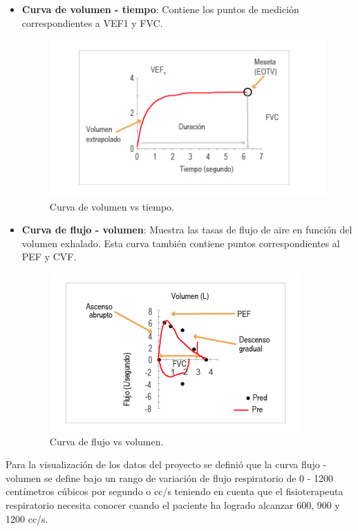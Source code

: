 \documentclass[12pt]{article}
\begin{document}
\begin{itemize}
    \item \textbf{Curva de volumen - tiempo}: Contiene los puntos de medición correspondientes a VEF1 y FVC.

        \begin{figure}[ht]
        \centering
        \includegraphics[scale=0.7]{imag/vvstiempo.png}
        \caption{Curva de volumen vs tiempo. }
        \label{4}
        \end{figure}
        \FloatBarrier

    
    \item \textbf{Curva de flujo - volumen}: Muestra las tasas de flujo de aire en función del volumen exhalado. Esta curva también contiene puntos correspondientes al PEF y CVF.
    
        \begin{figure}[ht]
        \centering
        \includegraphics[scale=0.7]{imag/flujovs.png}
        \caption{Curva de flujo vs volumen. }
        \label{4}
        \end{figure}
        \FloatBarrier
    
    
\end{itemize}

Para la visualización de los datos del proyecto se definió que la curva flujo - volumen se define bajo un rango de variación de flujo respiratorio de  0 - 1200 centímetros cúbicos por segundo o cc/s teniendo en cuenta que el fisioterapeuta respiratorio necesita conocer cuando el paciente ha logrado alcanzar 600, 900 y 1200 cc/s.
\end{document}
